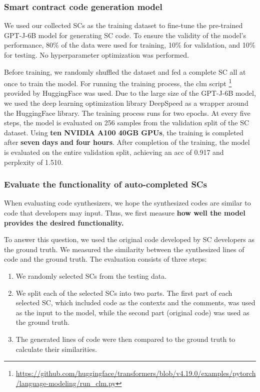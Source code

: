 \documentclass[12pt]{book}
\begin{document}
\subsubsection{Smart contract code generation model}
\label{sec:smart-contract-generation-model}

We used our collected SCs as the training dataset to fine-tune the pre-trained GPT-J-6B model for generating SC code. To ensure the validity of the model's performance, 80\% of the data were used for training, 10\% for validation, and 10\% for testing. No hyperparameter optimization was performed.

Before training, we randomly shuffled the dataset and fed a complete SC all at once to train the model. For running the training process, the \acrshort{clm} script \footnote{\url{https://github.com/huggingface/transformers/blob/v4.19.0/examples/pytorch/language-modeling/run_clm.py}} provided by HuggingFace was used. Due to the large size of the GPT-J-6B model, we used the deep learning optimization library DeepSpeed \cite{deepspeed} as a wrapper around the HuggingFace library. The training process runs for two epochs. At every five steps, the model is evaluated on 256 samples from the validation split of the SC dataset. Using \textbf{ten NVIDIA A100 40GB GPUs}, the training is completed after \textbf{seven days and four hours}. After completion of the training, the model is evaluated on the entire validation split, achieving an \acrfull{acc} of 0.917 and perplexity of 1.510.


\subsubsection{Evaluate the functionality of auto-completed SCs}
\label{sec:eval-quality-synthesis}
When evaluating code synthesizers, we hope the synthesized codes are similar to code that developers may input. Thus, we first measure \textbf{how well the model provides the desired functionality.} 

To answer this question, we used the original code developed by SC developers as the ground truth. We measured the similarity between the synthesized lines of code and the ground truth. The evaluation consists of three steps:
\begin{enumerate}
    \item We randomly selected SCs from the testing data.
    \item We split each of the selected SCs into two parts. The first part of each selected SC, which included code as the contexts and the comments, was used as the input to the model, while the second part (original code) was used as the ground truth.
    \item The generated lines of code were then compared to the ground truth to calculate their similarities.
\end{enumerate}
\end{document}
